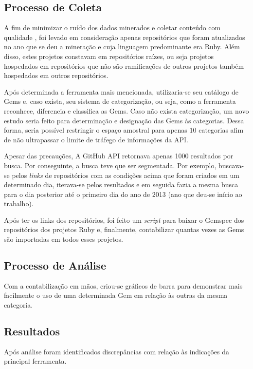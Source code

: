 \subsection{Processo de Coleta}

A fim de minimizar o ruído dos dados minerados e coletar conteúdo com qualidade \cite{Kalliamvakou:2014:PPM:2597073.2597074}, foi levado em consideração apenas repositórios que foram atualizados no ano que se deu a mineração e cuja linguagem predominante era Ruby. Além disso, estes projetos constavam em repositórios raízes, ou seja projetos hospedados em repositórios que não são ramificações de outros projetos também hospedados em outros repositórios.

Após determinada a ferramenta mais mencionada, utilizaria-se seu catálogo de Gems e, caso exista, seu sistema de categorização, ou seja, como a ferramenta reconhece, diferencia e classifica as Gems. Caso não exista categorização, um novo estudo seria feito para determinação e designação das Gems às categorias. Dessa forma, seria possível restringir o espaço amostral para apenas 10 categorias afim de não ultrapassar o limite de tráfego de informações da API.

Apesar das precauções, A GitHub API retornava apenas 1000 resultados por busca. Por conseguinte, a busca teve que ser segmentada. Por exemplo, buscava-se pelos \textit{links} de repositórios com as condições acima que foram criados em um determinado dia, iterava-se pelos resultados e em seguida fazia a mesma busca para o dia posterior até o primeiro dia do ano de 2013 (ano que deu-se início ao trabalho).

Após ter os links dos repositórios, foi feito um \textit{script} para baixar o Gemspec dos repositórios dos projetos Ruby e, finalmente, contabilizar quantas vezes as Gems são importadas em todos esses projetos.

\subsection{Processo de Análise}

Com a contabilização em mãos, criou-se gráficos de barra para demonstrar mais facilmente o uso de uma determinada Gem em relação às outras da mesma categoria.

\subsection{Resultados}

Após análise foram identificados discrepâncias com relação às indicações da principal ferramenta.

